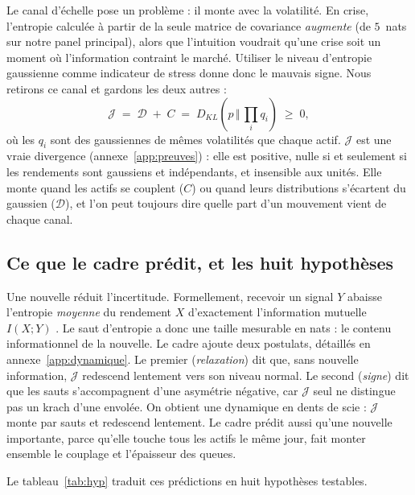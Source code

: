 \documentclass[11pt]{article}
\theoremstyle{definition}
\newcommand{\JJ}{\mathcal{J}}
\newcommand{\DD}{\mathcal{D}}
\newcommand{\KL}[2]{D_{KL}\!\left(#1\,\Vert\,#2\right)}
\begin{document}
Le canal d'échelle pose un problème : il monte avec la volatilité. En crise,
l'entropie calculée à partir de la seule matrice de covariance \emph{augmente}
(de $5$~nats sur notre panel principal), alors que l'intuition voudrait qu'une
crise soit un moment où l'information contraint le marché. Utiliser le niveau
d'entropie gaussienne comme indicateur de stress donne donc le mauvais signe.
Nous retirons ce canal et gardons les deux autres :
\begin{equation}
\label{eq:J}
\JJ \;=\; \DD \;+\; C \;=\; \KL{p}{\textstyle\prod_i q_i} \;\ge\; 0 ,
\end{equation}
où les $q_i$ sont des gaussiennes de mêmes volatilités que chaque actif.
$\JJ$ est une vraie divergence (annexe~\ref{app:preuves}) : elle est positive,
nulle si et seulement si les rendements sont gaussiens et indépendants, et
insensible aux unités. Elle monte quand les actifs se couplent ($C$) ou quand
leurs distributions s'écartent du gaussien ($\DD$), et l'on peut toujours dire
quelle part d'un mouvement vient de chaque canal.

\subsection{Ce que le cadre prédit, et les huit hypothèses}

Une nouvelle réduit l'incertitude. Formellement, recevoir un signal $Y$ abaisse
l'entropie \emph{moyenne} du rendement $X$ d'exactement l'information mutuelle
$I(X;Y)$ \citep{cover2006}. Le saut d'entropie a donc une taille mesurable en
nats : le contenu informationnel de la nouvelle. Le cadre ajoute deux
postulats, détaillés en annexe~\ref{app:dynamique}. Le premier
(\emph{relaxation}) dit que, sans nouvelle information, $\JJ$ redescend
lentement vers son niveau normal. Le second (\emph{signe}) dit que les sauts
s'accompagnent d'une asymétrie négative, car $\JJ$ seul ne distingue pas un
krach d'une envolée. On obtient une dynamique en dents de scie : $\JJ$ monte
par sauts et redescend lentement. Le cadre prédit aussi qu'une nouvelle
importante, parce qu'elle touche tous les actifs le même jour, fait monter
ensemble le couplage et l'épaisseur des queues.

Le tableau~\ref{tab:hyp} traduit ces prédictions en huit hypothèses testables.
\end{document}
